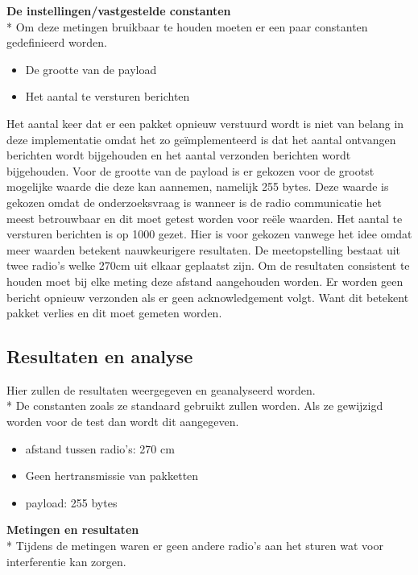 \documentclass{article}
\begin{document}
\textbf{De instellingen/vastgestelde constanten}\\*
\setlength{\parskip}{10pt plus 1pt minus 1pt}
Om deze metingen bruikbaar te houden moeten er een paar constanten gedefinieerd worden.
\begin{itemize}
	\item De grootte van de payload
	\item Het aantal te versturen berichten
\end{itemize}
Het aantal keer dat er een pakket opnieuw verstuurd wordt is niet van belang in deze implementatie omdat het zo ge\"{i}mplementeerd is dat het aantal ontvangen berichten wordt bijgehouden en het aantal verzonden berichten wordt bijgehouden. 
Voor de grootte van de payload is er gekozen voor de grootst mogelijke waarde die deze kan aannemen, namelijk 255 bytes. Deze waarde is gekozen omdat de onderzoeksvraag is wanneer is de radio communicatie het meest betrouwbaar en dit moet getest worden voor re\"{e}le waarden. 
Het aantal te versturen berichten is op 1000 gezet. Hier is voor gekozen vanwege het idee omdat meer waarden betekent nauwkeurigere resultaten.
\newline
\newline
De meetopstelling bestaat uit twee radio's welke 270cm uit elkaar geplaatst zijn. Om de resultaten consistent te houden moet bij elke meting deze afstand aangehouden worden. 
Er worden geen bericht opnieuw verzonden als er geen acknowledgement volgt. Want dit betekent pakket verlies en dit moet gemeten worden. 

\subsection{Resultaten en analyse}
Hier zullen de resultaten weergegeven en geanalyseerd worden. \\*
  De constanten zoals ze standaard gebruikt zullen worden. Als ze gewijzigd worden voor de test dan wordt dit aangegeven. 
  \begin{itemize}
  	\item afstand tussen radio's: 270 cm
  	\item Geen hertransmissie van pakketten
  	\item payload: 255 bytes
  \end{itemize}
  
\textbf {Metingen en resultaten}  \\*
Tijdens de metingen waren er geen andere radio's aan het sturen wat voor interferentie kan zorgen.
\end{document}
